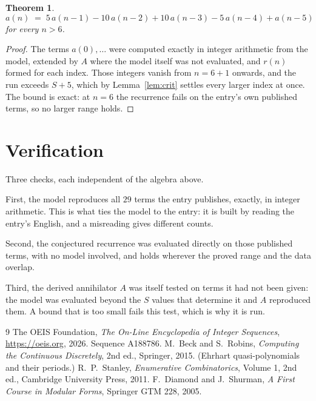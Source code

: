 \documentclass[11pt,a4paper]{article}
\theoremstyle{plain}
\newtheorem{theorem}{Theorem}
\theoremstyle{definition}
\begin{document}
\begin{theorem}
\[
a(n)\;=\;5\,a(n-1) - 10\,a(n-2) + 10\,a(n-3) - 5\,a(n-4) + a(n-5)
\]
for every $n>6$.
\end{theorem}

\begin{proof}
The terms $a(0),\dots$ were computed exactly in integer arithmetic from the model, extended by
$A$ where the model itself was not evaluated, and $r(n)$ formed for each index. Those integers
vanish from $n=6+1$ onwards, and the run exceeds $S+5$, which by
Lemma~\ref{lem:crit} settles every larger index at once. The bound is exact: at $n=6$ the recurrence fails on the entry's own published terms, so no larger range holds.
\end{proof}

\section{Verification}

Three checks, each independent of the algebra above.

First, the model reproduces all $29$ terms the entry publishes, exactly, in integer
arithmetic. This is what ties the model to the entry: it is built by reading the entry's
English, and a misreading gives different counts.

Second, the conjectured recurrence was evaluated directly on those published terms, with no
model involved, and holds wherever the proved range and the data overlap.

Third, the derived annihilator $A$ was itself tested on terms it had not been given: the model
was evaluated beyond the $S$ values that determine it and $A$ reproduced them. A bound that is
too small fails this test, which is why it is run.

\begin{thebibliography}{9}
 The OEIS Foundation, \emph{The On-Line Encyclopedia of Integer
Sequences}, \url{https://oeis.org}, 2026. Sequence A188786.
 M.~Beck and S.~Robins, \emph{Computing the Continuous Discretely},
2nd ed., Springer, 2015. (Ehrhart quasi-polynomials and their periods.)
 R.~P.~Stanley, \emph{Enumerative Combinatorics}, Volume 1, 2nd ed.,
Cambridge University Press, 2011.
 F.~Diamond and J.~Shurman, \emph{A First Course in Modular Forms},
Springer GTM 228, 2005.
\end{thebibliography}
\end{document}
